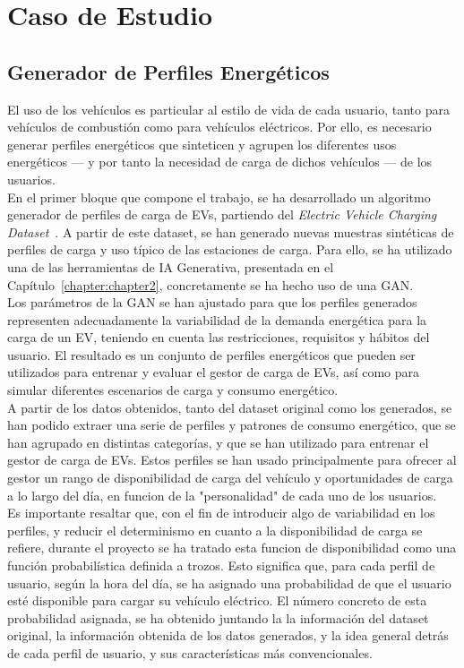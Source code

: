 \chapter{Caso de Estudio}
\label{chapter:chapter4}
\section{Generador de Perfiles Energéticos}
El uso de los vehículos es particular al estilo de vida de cada usuario, tanto para vehículos de
combustión como para vehículos eléctricos. Por ello, es necesario generar perfiles energéticos que
sinteticen y agrupen los diferentes usos energéticos — y por tanto la necesidad de carga de dichos
vehículos — de los usuarios.\\

En el primer bloque que compone el trabajo, se ha desarrollado un algoritmo generador de perfiles 
de carga de EVs, partiendo del \textit{Electric Vehicle Charging Dataset}~\cite{kaggle_ev_charging_patterns}.
A partir de este dataset, se han generado nuevas muestras sintéticas de perfiles de carga y uso 
típico de las estaciones de carga. Para ello, se ha utilizado una de las herramientas de IA 
Generativa, presentada en el Capítulo~\ref{chapter:chapter2}, concretamente se ha hecho uso de una
GAN.\\

Los parámetros de la GAN se han ajustado para que los perfiles generados representen adecuadamente
la variabilidad de la demanda energética para la carga de un EV, teniendo en cuenta las restricciones,
requisitos y hábitos del usuario. El resultado es un conjunto de perfiles energéticos que pueden
ser utilizados para entrenar y evaluar el gestor de carga de EVs, así como para simular diferentes
escenarios de carga y consumo energético.\\

A partir de los datos obtenidos, tanto del dataset original como los generados, se han podido 
extraer una serie de perfiles y patrones de consumo energético, que se han agrupado en distintas 
categorías, y que se han utilizado para entrenar el gestor de carga de EVs. Estos perfiles se han
usado principalmente para ofrecer al gestor un rango de disponibilidad de carga del vehículo y 
oportunidades de carga a lo largo del día, en funcion de la "personalidad" de cada uno de los 
usuarios.\\

Es importante resaltar que, con el fin de introducir algo de variabilidad en los perfiles, y reducir
el determinismo en cuanto a la disponibilidad de carga se refiere, durante el proyecto se ha 
tratado esta funcion de disponibilidad como una función probabilística definida a trozos. Esto 
significa que, para cada perfil de usuario, según la hora del día, se ha asignado una probabilidad
de que el usuario esté disponible para cargar su vehículo eléctrico. El número concreto de esta
probabilidad asignada, se ha obtenido juntando la la información del dataset original, la 
información obtenida de los datos generados, y la idea general detrás de cada perfil de usuario, y
sus características más convencionales.\\

